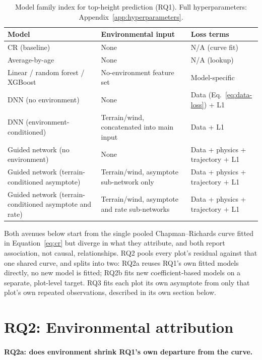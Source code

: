 \documentclass[11pt,a4paper]{report}
\begin{document}
\begin{table}[!htbp]
\centering
\scriptsize
\renewcommand{\arraystretch}{1.2}
\begin{tabular}{p{4.6cm}p{4.4cm}p{4.4cm}}
\toprule
Model & Environmental input & Loss terms \\
\midrule
CR (baseline) & None & N/A (curve fit) \\
Average-by-age & None & N/A (lookup) \\
Linear / random forest / XGBoost & No-environment feature set & Model-specific \\
DNN (no environment) & None & Data (Eq.~\ref{eq:data-loss}) + L1 \\
DNN (environment-conditioned) & Terrain/wind, concatenated into main input & Data + L1 \\
Guided network (no environment) & None & Data + physics + trajectory + L1 \\
Guided network (terrain-conditioned asymptote) & Terrain/wind, asymptote sub-network only & Data +
physics + trajectory + L1 \\
Guided network (terrain-conditioned asymptote and rate) & Terrain/wind, asymptote and rate
sub-networks & Data + physics + trajectory + L1 \\
\bottomrule
\end{tabular}
\caption{Model family index for top-height prediction (RQ1). Full hyperparameters:
Appendix~\ref{app:hyperparameters}.}
\label{tab:rq1-models}
\end{table}

Both avenues below start from the single pooled Chapman--Richards curve fitted in
Equation~\ref{eq:cr} but diverge in what they attribute, and both report association, not causal,
relationships. RQ2 pools every plot's residual against that one shared curve, and splits into two:
RQ2a reuses RQ1's own fitted models directly, no new model is fitted; RQ2b fits new
coefficient-based models on a separate, plot-level target. RQ3 fits each plot its own asymptote
from only that plot's own repeated observations, described in its own section below.

\section{RQ2: Environmental attribution}

\paragraph*{RQ2a: does environment shrink RQ1's own departure from the curve.}
\end{document}

